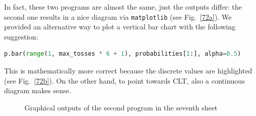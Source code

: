 \documentclass[]{interact}
\theoremstyle{plain}%
\theoremstyle{definition}
\theoremstyle{remark}
\begin{document}
In fact, these two programs are almost the same, just the outputs differ: the second
one results in a nice diagram via \texttt{matplotlib} (see Fig.~\ref{72a}). We provided an alternative
way to plot a vertical bar chart with the following suggestion:
\begin{lstlisting}[language=Python,firstnumber=10]
  p.bar(range(1, max_tosses * 6 + 1), probabilities[1:], alpha=0.5)
\end{lstlisting}
This is mathematically more correct because the discrete values are highlighted
(see Fig.~\ref{72b}).
On the other hand, to point towards CLT, also a continuous diagram makes sense.

\begin{figure}
\centering
{}\hspace{5pt}
\caption{Graphical outputs of the second program in the seventh sheet} \label{sample-figure}
\end{figure}
\end{document}
